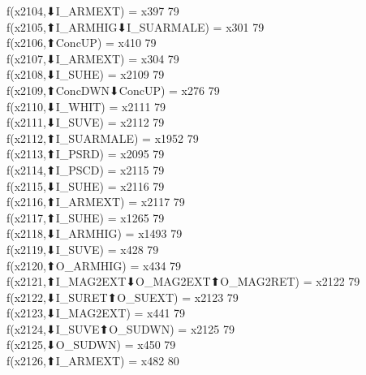 f(x2104,⬇I_ARMEXT) = x397 {79} \\
f(x2105,⬆I_ARMHIG⬇I_SUARMALE) = x301 {79} \\
f(x2106,⬆ConcUP) = x410 {79} \\
f(x2107,⬇I_ARMEXT) = x304 {79} \\
f(x2108,⬇I_SUHE) = x2109 {79} \\
f(x2109,⬆ConcDWN⬇ConcUP) = x276 {79} \\
f(x2110,⬇I_WHIT) = x2111 {79} \\
f(x2111,⬇I_SUVE) = x2112 {79} \\
f(x2112,⬆I_SUARMALE) = x1952 {79} \\
f(x2113,⬆I_PSRD) = x2095 {79} \\
f(x2114,⬆I_PSCD) = x2115 {79} \\
f(x2115,⬇I_SUHE) = x2116 {79} \\
f(x2116,⬆I_ARMEXT) = x2117 {79} \\
f(x2117,⬆I_SUHE) = x1265 {79} \\
f(x2118,⬇I_ARMHIG) = x1493 {79} \\
f(x2119,⬇I_SUVE) = x428 {79} \\
f(x2120,⬆O_ARMHIG) = x434 {79} \\
f(x2121,⬆I_MAG2EXT⬇O_MAG2EXT⬆O_MAG2RET) = x2122 {79} \\
f(x2122,⬇I_SURET⬆O_SUEXT) = x2123 {79} \\
f(x2123,⬇I_MAG2EXT) = x441 {79} \\
f(x2124,⬇I_SUVE⬆O_SUDWN) = x2125 {79} \\
f(x2125,⬇O_SUDWN) = x450 {79} \\
f(x2126,⬆I_ARMEXT) = x482 {80} \\
